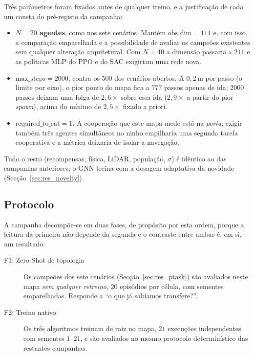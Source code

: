 Três parâmetros foram fixados antes de qualquer treino, e a justificação de cada
um consta do pré-registo da campanha:

\begin{itemize}
    \item \textbf{$N = 20$ agentes}, como nos sete cenários. Mantém
          $\text{obs\_dim} = 111$ e, com isso, a comparação emparelhada e a
          possibilidade de avaliar os campeões existentes sem qualquer alteração
          arquitetural. Com $N = 40$ a dimensão passaria a $211$ e as políticas
          MLP do PPO e do SAC exigiriam uma rede nova.
    \item \textbf{$\text{max\_steps} = 2000$}, contra os $500$ dos cenários
          abertos. A $0{,}2$\,m por passo (o limite por eixo), o pior ponto do
          mapa fica a $777$ passos apenas de ida; $2000$ passos deixam uma folga
          de $2{,}6\times$ sobre essa ida ($2{,}9\times$ a partir do pior
          \textit{spawn}), acima do mínimo de $2{,}5\times$ fixado a priori.
    \item \textbf{$\text{required\_to\_eat} = 1$.} A cooperação que este mapa
          mede está na \emph{porta}; exigir também três agentes simultâneos no
          ninho empilharia uma segunda tarefa cooperativa e a métrica deixaria de
          isolar a navegação.
\end{itemize}

Tudo o resto (recompensas, física, LiDAR, população, $\sigma$) é idêntico
ao das campanhas anteriores; o GNN treina com a dosagem adaptativa da
novidade (Secção~\ref{sec:res_novelty}).

\subsection{Protocolo}

A campanha decompõe-se em duas fases, de propósito por esta ordem, porque a
leitura da primeira não depende da segunda e o contraste entre ambas é, em si,
um resultado:

\begin{description}
    \item[F1: Zero-Shot de topologia] Os campeões dos sete cenários
          (Secção~\ref{sec:res_ptask}) são avaliados neste mapa \emph{sem
          qualquer retreino}, $20$ episódios por célula, com sementes
          emparelhadas. Responde a ``o que já sabíamos transfere?''.
    \item[F2: Treino nativo] Os três algoritmos treinam de raiz no mapa,
          $21$ execuções independentes com sementes $1$--$21$, e são avaliados no
          mesmo protocolo determinístico das restantes campanhas.
\end{description}

